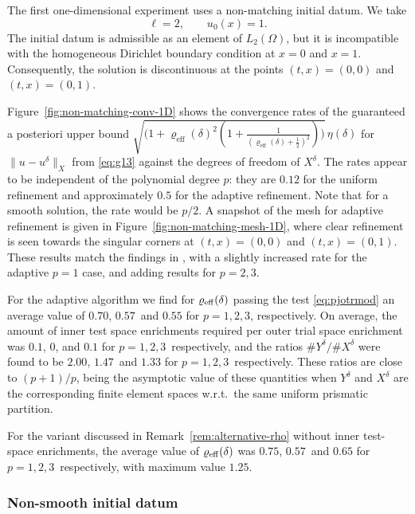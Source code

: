 \documentclass{amsart}
\numberwithin{equation}{section}
\newcommand{\1}{\mathbb 1}
\begin{document}
The first one-dimensional experiment uses a non-matching initial datum. We take 
\[
    \ell = 2, \qquad
    u_0(x) = 1 .
\]
The initial datum is admissible as an element of $L_2(\Omega)$, but it is incompatible with the homogeneous Dirichlet boundary condition at $x=0$ and $x=1$. Consequently, the solution is discontinuous at the points $(t,x)=(0,0)$ and $(t,x)=(0,1)$.

Figure~\ref{fig:non-matching-conv-1D} shows the convergence rates of the guaranteed a posteriori upper bound $\sqrt{\big(1+\varrho_{\mathrm{eff}}(\delta)^2(1+\tfrac{1}{(\varrho_{\mathrm{eff}}(\delta)+\frac12)^2})\big)}\,\eta(\delta)$ for $\|u-u^\delta\|_X$ from \eqref{eq:g13}
 against the degrees of freedom of $X^\delta$. The rates appear to be independent of the polynomial degree $p$: they are $0.12$ for the uniform refinement and approximately $0.5$ for the adaptive refinement. Note that for a smooth solution, the rate would be $p/2$. A snapshot of the mesh for adaptive refinement is given in Figure~\ref{fig:non-matching-mesh-1D}, where clear refinement is seen towards the singular corners at $(t,x) = (0,0)$ and $(t,x) = (0,1)$. These results match the findings in \cite{75.291}, with a slightly increased rate for the adaptive $p=1$ case, and adding results for $p=2,3$. 
 
For the adaptive algorithm we find for $\varrho_{\rm eff}(\delta)$ passing the test \eqref{eq:pjotrmod} an average value of $0.70$, $0.57$\, and $0.55$ for $p=1,2,3$, respectively.
On average, the amount of inner test space enrichments required per outer trial space enrichment was $0.1$, $0$, and $0.1$ for $p=1,2,3$\, respectively, and the ratios $\#Y^\delta / \#X^\delta$ were found to be $2.00$, $1.47$\, and $1.33$ for $p=1,2,3$\, respectively. These ratios are close to $(p+1)/p$, 
being the asymptotic value of these quantities when $Y^\delta$ and $X^\delta$ are the corresponding finite element spaces w.r.t.~the same uniform prismatic partition.

For the variant discussed in Remark~\ref{rem:alternative-rho} without inner test-space enrichments, the average value of $\varrho_{\rm eff}(\delta)$ was 
$0.75$, $0.57$\, and $0.65$ for $p=1,2,3$\, respectively, with maximum value $1.25$.

\subsubsection{Non-smooth initial datum}
\label{subsubsec:1d-boundary-singularity}
\end{document}
